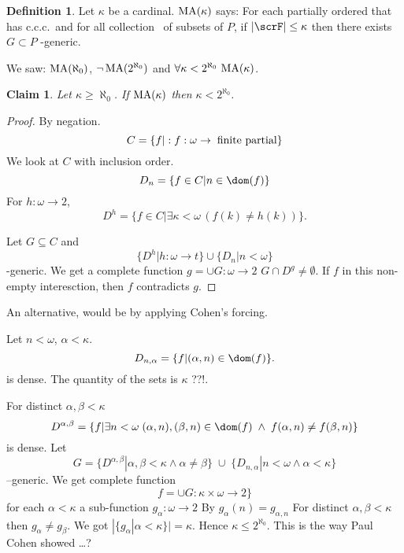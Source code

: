 \documentclass[11pt,pdftex,twoside,a4paper]{article}
\newcommand{\MA}{\ensuremath{\mathop{\rm MA}\nolimits}}
\newcommand{\ccc}{c.c.c.}
\newtheorem{claim}[thm]{Claim}
\theoremstyle{definition}
\newtheorem{ldef}[thm]{Definition}
\begin{document}
\begin{ldef}
Let \(\kappa\) be a cardinal.
\(\MA(\kappa)\) says: For each partially ordered  that 
has \ccc\ and for all collection \scrF\ of subsets of $P$,
if \(|\scrF| \leq \kappa\) then there exists \(G\subset P\) \scrF-generic.
\end{ldef}
We saw: \(\MA(\aleph_0)\), \(\lnot\MA(2^{\aleph_0})\) and 
\(\forall \kappa < 2^{\aleph_0}\, \MA(\kappa)\).

\begin{claim}
Let \(\kappa \geq \aleph_0\). If \(\MA(\kappa)\) then \(\kappa < 2^{\aleph_0}\).
\end{claim}
\begin{proof}
By negation.
\begin{equation*}
C = \{f|: f: \omega \to \;\textnormal{finite partial}\}
\end{equation*}
We look at $C$ with inclusion order.
\begin{equation*}
D_n = \{f\in C| n \in \dom(f)\}
\end{equation*}
For \(h:\omega\to 2\),
\begin{equation*}
D^h = \{f\in C | \exists \kappa < \omega\, (f(k)\neq h(k))\}.
\end{equation*}

Let \(G\subseteq C\) and 
\begin{equation*}
\{D^h | h:\omega\to t\} \cup \{D_n | n < \omega\}
\end{equation*}
-generic. We get a complete function \(g = \cup G:\omega \to 2\)
\(G \cap D^g\neq \emptyset\). 
If $f$ in this non-empty interesction, then $f$ contradicts $g$.
\end{proof}

An alternative, would be by applying Cohen's forcing.

Let \(n<\omega\), \(\alpha < \kappa\).
\begin{equation*}
D_{n,\alpha} = \{f | (\alpha,n)\in \dom(f)\}.
\end{equation*}
is dense. The quantity of the sets is \(\kappa\) ??!.

For distinct \(\alpha,\beta < \kappa\)
\begin{equation*}
D^{\alpha,\beta} = \{f | \exists n < \omega\; (\alpha,n),(\beta,n)\in \dom(f)
\;\land\; f(\alpha,n) \neq f(\beta,n)\}
\end{equation*}
is dense. Let
\begin{equation*}
G = \{D^{\alpha,\beta}| \alpha,\beta<\kappa\land \alpha\neq\beta\}
\;\cup\; \{D_{n,\alpha} | n < \omega \land \alpha < \kappa\}
\end{equation*}
--generic. We get complete function
\begin{equation*}
f = \cup G: \kappa\times\omega \to 2\}
\end{equation*}
for each \(\alpha<\kappa\) a sub-function \(g_\alpha : \omega \to 2\)
By \(g_\alpha(n) = g_{\alpha,n}\)
For distinct \(\alpha,\beta <\kappa\) then \(g_\alpha \neq g_\beta\).
We got \(|\{g_\alpha | \alpha < \kappa\}|= \kappa\).
Hence \(\kappa \leq 2^{\aleph_0}\).
This is the way Paul Cohen showed \ldots ?
\end{document}
